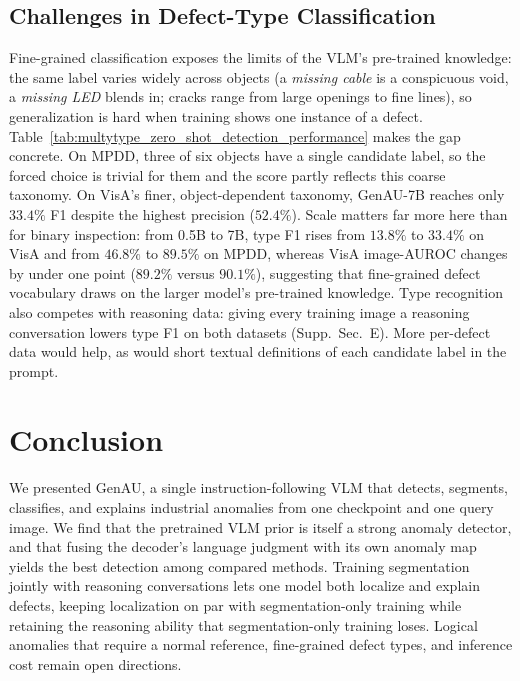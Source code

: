 \subsection{Challenges in Defect-Type Classification}
Fine-grained classification exposes the limits of the VLM's pre-trained knowledge: the same label varies widely across objects (a \textit{missing cable} is a conspicuous void, a \textit{missing LED} blends in; cracks range from large openings to fine lines), so generalization is hard when training shows one instance of a defect. Table~\ref{tab:multytype_zero_shot_detection_performance} makes the gap concrete. On MPDD, three of six objects have a single candidate label, so the forced choice is trivial for them and the score partly reflects this coarse taxonomy. On VisA's finer, object-dependent taxonomy, GenAU-7B reaches only $33.4\%$ F1 despite the highest precision ($52.4\%$). Scale matters far more here than for binary inspection: from 0.5B to 7B, type F1 rises from $13.8\%$ to $33.4\%$ on VisA and from $46.8\%$ to $89.5\%$ on MPDD, whereas VisA image-AUROC changes by under one point ($89.2\%$ versus $90.1\%$), suggesting that fine-grained defect vocabulary draws on the larger model's pre-trained knowledge. Type recognition also competes with reasoning data: giving every training image a reasoning conversation lowers type F1 on both datasets (Supp.~Sec.~E). More per-defect data would help, as would short textual definitions of each candidate label in the prompt.

\section{Conclusion}
We presented GenAU, a single instruction-following VLM that detects, segments, classifies, and explains industrial anomalies from one checkpoint and one query image. We find that the pretrained VLM prior is itself a strong anomaly detector, and that fusing the decoder's language judgment with its own anomaly map yields the best detection among compared methods. Training segmentation jointly with reasoning conversations lets one model both localize and explain defects, keeping localization on par with segmentation-only training while retaining the reasoning ability that segmentation-only training loses. Logical anomalies that require a normal reference, fine-grained defect types, and inference cost remain open directions.





